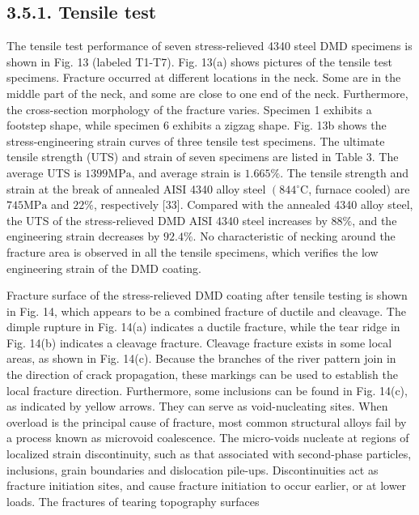 \documentclass[10pt]{article}
\begin{document}
\subsection*{3.5.1. Tensile test}
The tensile test performance of seven stress-relieved 4340 steel DMD specimens is shown in Fig. 13 (labeled T1-T7). Fig. 13(a) shows pictures of the tensile test specimens. Fracture occurred at different locations in the neck. Some are in the middle part of the neck, and some are close to one end of the neck. Furthermore, the cross-section morphology of the fracture varies. Specimen 1 exhibits a footstep shape, while specimen 6 exhibits a zigzag shape. Fig. 13b shows the stress-engineering strain curves of three tensile test specimens. The ultimate tensile strength (UTS) and strain of seven specimens are listed in Table 3. The average UTS is $1399 \mathrm{MPa}$, and average strain is $1.665 \%$. The tensile strength and strain at the break of annealed AISI 4340 alloy steel $\left(844{ }^{\circ} \mathrm{C}\right.$, furnace cooled) are $745 \mathrm{MPa}$ and $22 \%$, respectively [33]. Compared with the annealed 4340 alloy steel, the UTS of the stress-relieved DMD AISI 4340 steel increases by $88 \%$, and the engineering strain decreases by $92.4 \%$. No characteristic of necking around the fracture area is observed in all the tensile specimens, which verifies the low engineering strain of the DMD coating.

Fracture surface of the stress-relieved DMD coating after tensile testing is shown in Fig. 14, which appears to be a combined fracture of ductile and cleavage. The dimple rupture in Fig. 14(a) indicates a ductile fracture, while the tear ridge in Fig. 14(b) indicates a cleavage fracture. Cleavage fracture exists in some local areas, as shown in Fig. 14(c). Because the branches of the river pattern join in the direction of crack propagation, these markings can be used to establish the local fracture direction. Furthermore, some inclusions can be found in Fig. 14(c), as indicated by yellow arrows. They can serve as void-nucleating sites. When overload is the principal cause of fracture, most common structural alloys fail by a process known as microvoid coalescence. The micro-voids nucleate at regions of localized strain discontinuity, such as that associated with second-phase particles, inclusions, grain boundaries and dislocation pile-ups. Discontinuities act as fracture initiation sites, and cause fracture initiation to occur earlier, or at lower loads. The fractures of tearing topography surfaces
\end{document}
